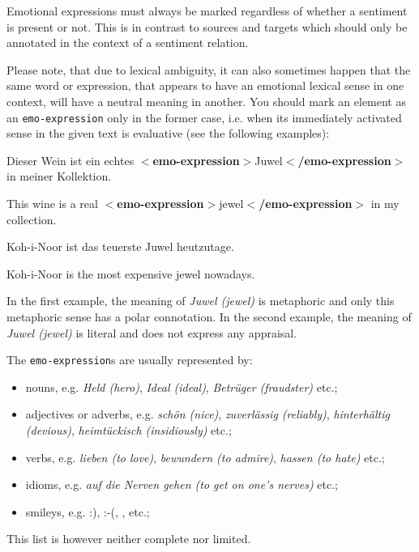 \documentclass[11pt,a4paper]{article}
\newcommand{\xmltag}[1]{{\textbf{\small$<$#1$>$}}}
\newcommand{\emoexpression}[1]{\xmltag{emo-expression}#1\xmltag{/emo-expression}}
\newenvironment{myexe}{
  \begin{exe}
    \ex\begin{center}
    \itshape
}{
    \end{center}
  \end{exe}
}
\begin{document}
Emotional expressions must always be marked regardless of whether a
sentiment is present or not. This is in contrast to sources and
targets which should only be annotated in the context of a sentiment
relation.

Please note, that due to lexical ambiguity, it can also sometimes
happen that the same word or expression, that appears to have an
emotional lexical sense in one context, will have a neutral meaning in
another.  You should mark an element as an \texttt{emo-expression}
only in the former case, i.e. when its immediately activated sense in
the given text is evaluative (see the following examples):
\begin{myexe}
  Dieser Wein ist ein echtes \emoexpression{Juwel} in meiner
  Kollektion.

  This wine is a real \emoexpression{jewel} in my collection.
\end{myexe}
\begin{myexe}
  Koh-i-Noor ist das teuerste Juwel heutzutage.

  Koh-i-Noor is the most expensive jewel nowadays.
\end{myexe}
In the first example, the meaning of \textit{Juwel (jewel)} is
metaphoric and only this metaphoric sense has a polar connotation.  In
the second example, the meaning of \textit{Juwel (jewel)} is literal
and does not express any appraisal.

The \texttt{emo-expression}s are usually represented by:
\begin{itemize}
  \item nouns, e.g. \textit{Held (hero)}, \textit{Ideal (ideal)},
    \textit{Betr\"uger (fraudster)} etc.;

  \item adjectives or adverbs, e.g. \textit{sch\"on (nice)},
    \textit{zuverl\"assig (reliably)}, \textit{hinterh\"altig
      (devious)}, \textit{heimt\"uckisch (insidiously)} etc.;

  \item verbs, e.g. \textit{lieben (to love)}, \textit{bewundern (to
    admire)}, \textit{hassen (to hate)} etc.;

  \item idioms, e.g. \textit{auf die Nerven gehen (to get on one's
    nerves)} etc.;

  \item smileys, e.g. :), :-(, \smiley{}, \frownie{} etc.;
\end{itemize}
This list is however neither complete nor limited.
\end{document}
